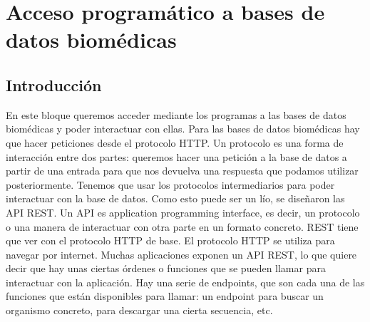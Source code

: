 \chapter{Acceso programático a bases de datos biomédicas}
\section{Introducción}
En este bloque queremos acceder mediante los programas a las bases de datos biomédicas y poder interactuar con ellas. Para las bases de datos biomédicas hay que hacer peticiones desde el protocolo HTTP. Un protocolo es una forma de interacción entre dos partes: queremos hacer una petición a la base de datos a partir de una entrada para que nos devuelva una respuesta que podamos utilizar posteriormente. Tenemos que usar los protocolos intermediarios para poder interactuar con la base de datos. Como esto puede ser un lío, se diseñaron las API REST. Un API es application programming interface, es decir, un protocolo o una manera de interactuar con otra parte en un formato concreto. REST tiene que ver con el protocolo HTTP de base. El protocolo HTTP se utiliza para navegar por internet. Muchas aplicaciones exponen un API REST, lo que quiere decir que hay unas ciertas órdenes o funciones que se pueden llamar para interactuar con la aplicación. Hay una serie de endpoints, que son cada una de las funciones que están disponibles para llamar: un endpoint para buscar un organismo concreto, para descargar una cierta secuencia, etc. 

